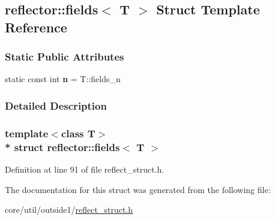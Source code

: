 \hypertarget{structreflector_1_1fields}{}\subsection{reflector\+:\+:fields$<$ T $>$ Struct Template Reference}
\label{structreflector_1_1fields}
\subsubsection*{Static Public Attributes}
\begin{DoxyCompactItemize}
\item 
static const int {\bfseries n} = T\+::fields\+\_\+n\hypertarget{structreflector_1_1fields_ac014becc2fc8fe474664a2767b3faa84}{}\label{structreflector_1_1fields_ac014becc2fc8fe474664a2767b3faa84}

\end{DoxyCompactItemize}


\subsubsection{Detailed Description}
\subsubsection*{template$<$class T$>$\\*
struct reflector\+::fields$<$ T $>$}



Definition at line 91 of file reflect\+\_\+struct.\+h.



The documentation for this struct was generated from the following file\+:\begin{DoxyCompactItemize}
\item 
core/util/outside1/\hyperlink{reflect__struct_8h}{reflect\+\_\+struct.\+h}\end{DoxyCompactItemize}
